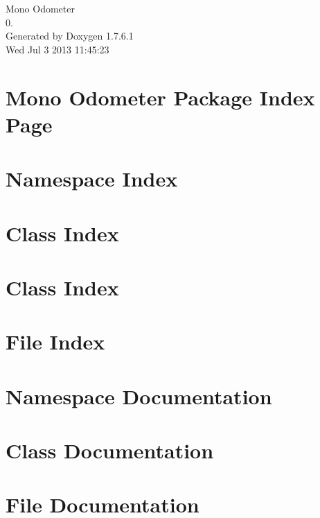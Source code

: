 \documentclass[a4paper]{book}
\begin{document}
\hypersetup{pageanchor=false,citecolor=blue}
\begin{titlepage}
\vspace*{7cm}
\begin{center}
{\Large \-Mono \-Odometer \\[1ex]\large 0. }\\
\vspace*{1cm}
{\large \-Generated by Doxygen 1.7.6.1}\\
\vspace*{0.5cm}
{\small Wed Jul 3 2013 11:45:23}\\
\end{center}
\end{titlepage}
\clearemptydoublepage
{}
\tableofcontents
\clearemptydoublepage
{}
\hypersetup{pageanchor=true,citecolor=blue}
\chapter{\-Mono \-Odometer \-Package \-Index \-Page}
\label{index}\hypertarget{index}{}
\chapter{\-Namespace \-Index}

\chapter{\-Class \-Index}

\chapter{\-Class \-Index}

\chapter{\-File \-Index}

\chapter{\-Namespace \-Documentation}

\chapter{\-Class \-Documentation}








\chapter{\-File \-Documentation}












\printindex
\end{document}
